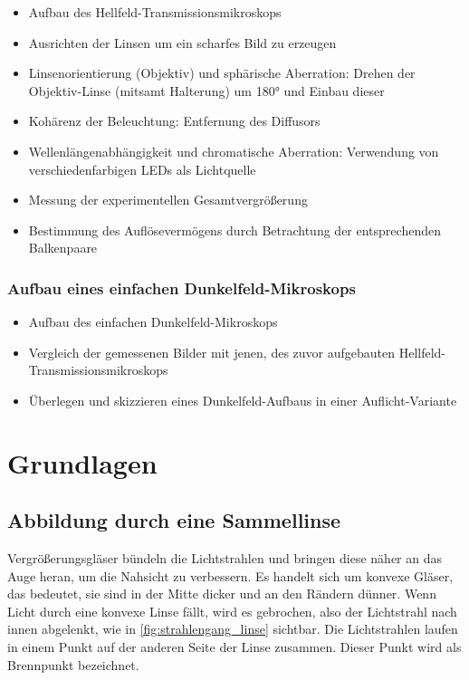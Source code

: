 \documentclass[12pt,english,ngerman]{scrartcl}
\begin{document}
\begin{itemize}
	\item Aufbau des Hellfeld-Transmissionsmikroskops
	\item Ausrichten der Linsen um ein scharfes Bild zu erzeugen
	\item Linsenorientierung (Objektiv) und sphärische Aberration: Drehen der
	      Objektiv-Linse (mitsamt Halterung) um 180° und Einbau dieser
	\item Kohärenz der Beleuchtung: Entfernung des Diffusors
	\item Wellenlängenabhängigkeit und chromatische Aberration: Verwendung von
	      verschiedenfarbigen LEDs als Lichtquelle
	\item Messung der experimentellen Gesamtvergrößerung
	\item Bestimmung des Auflösevermögens durch Betrachtung der entsprechenden
	      Balkenpaare
\end{itemize}

\subsubsection{Aufbau eines einfachen Dunkelfeld-Mikroskops}

\begin{itemize}
	\item Aufbau des einfachen Dunkelfeld-Mikroskops
	\item Vergleich der gemessenen Bilder mit jenen, des zuvor aufgebauten
	      Hellfeld-Transmissionsmikroskops
	\item Überlegen und skizzieren eines Dunkelfeld-Aufbaus in einer Auflicht-Variante
\end{itemize}

\section{Grundlagen}\label{Grund}

\subsection{Abbildung durch eine Sammellinse}

Vergrößerungsgläser bündeln die Lichtstrahlen und bringen diese näher an das
Auge heran, um die Nahsicht zu verbessern. Es handelt sich um konvexe Gläser,
das bedeutet, sie sind in der Mitte dicker und an den Rändern dünner. Wenn
Licht durch eine konvexe Linse fällt, wird es gebrochen, also der Lichtstrahl
nach innen abgelenkt, wie in \autoref{fig:strahlengang_linse} sichtbar. Die
Lichtstrahlen laufen in einem Punkt auf der anderen Seite der Linse zusammen.
Dieser Punkt wird als Brennpunkt bezeichnet.
\end{document}
